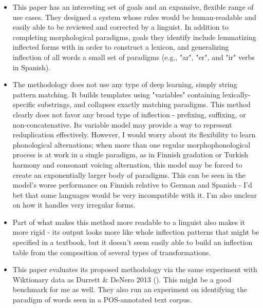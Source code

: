 \documentclass[12pt]{report}
\begin{document}
\begin{itemize}
	
	\item This paper has an interesting set of goals and an expansive, flexible range of use cases. They designed a system whose rules would be human-readable and easily able to be reviewed and corrected by a linguist. In addition to completing morphological paradigms, goals they identify include lemmatizing inflected forms with in order to construct a lexicon, and generalizing inflection of all words a small set of paradigms (e.g., "ar", "er", and "ir" verbs in Spanish).
	
	\item The methodology does not use any type of deep learning, simply string pattern matching. It builds templates using "variables" containing lexically-specific substrings, and collapses exactly matching paradigms. This method clearly does not favor any broad type of inflection - prefixing, suffixing, or non-concatenative. Its variable model may provide a way to represent reduplication effectively. However, I would worry about its flexibility to learn phonological alternations; when more than one regular morphophonological process is at work in a single paradigm, as in Finnish gradation or Turkish harmony and consonant voicing alternation, this model may be forced to create an exponentially larger body of paradigms. This can be seen in the model's worse performance on Finnish relative to German and Spanish - I'd bet that some languages would be very incompatible with it. I'm also unclear on how it handles very irregular forms.
	
	\item Part of what makes this method more readable to a linguist also makes it more rigid - its output looks more like whole inflection patterns that might be specified in a textbook, but it doesn't seem easily able to build an inflection table from the composition of several types of transformations.
	
	\item This paper evaluates its proposed methodology via the same experiment with Wiktionary data as Durrett \& DeNero 2013 (\cite{Durrett2013}). This might be a good benchmark for me as well. They also run an experiment on identifying the paradigm of words seen in a POS-annotated text corpus.
	
\end{itemize}

\end{document}
